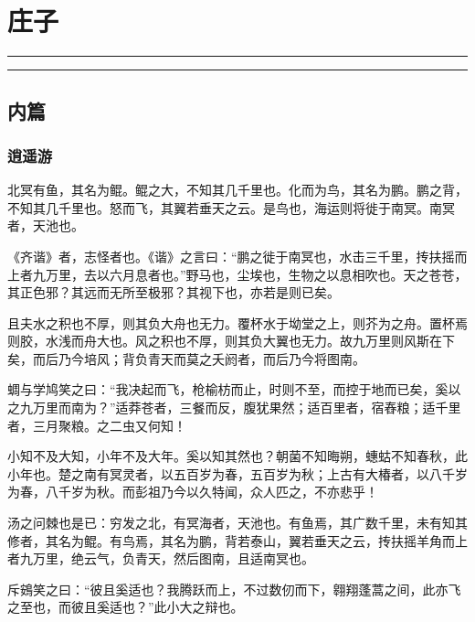 \documentclass[]{article}
\date{}
\begin{document}
\hypertarget{header-n0}{%
\section{庄子}\label{header-n0}}

\begin{center}\rule{0.5\linewidth}{\linethickness}\end{center}

\tableofcontents

\begin{center}\rule{0.5\linewidth}{\linethickness}\end{center}

\hypertarget{header-n8}{%
\subsection{内篇}\label{header-n8}}

\hypertarget{header-n9}{%
\subsubsection{逍遥游}\label{header-n9}}

北冥有鱼，其名为鲲。鲲之大，不知其几千里也。化而为鸟，其名为鹏。鹏之背，不知其几千里也。怒而飞，其翼若垂天之云。是鸟也，海运则将徙于南冥。南冥者，天池也。

《齐谐》者，志怪者也。《谐》之言曰：``鹏之徙于南冥也，水击三千里，抟扶摇而上者九万里，去以六月息者也。''野马也，尘埃也，生物之以息相吹也。天之苍苍，其正色邪？其远而无所至极邪？其视下也，亦若是则已矣。

且夫水之积也不厚，则其负大舟也无力。覆杯水于坳堂之上，则芥为之舟。置杯焉则胶，水浅而舟大也。风之积也不厚，则其负大翼也无力。故九万里则风斯在下矣，而后乃今培风；背负青天而莫之夭阏者，而后乃今将图南。

蜩与学鸠笑之曰：``我决起而飞，枪榆枋而止，时则不至，而控于地而已矣，奚以之九万里而南为？''适莽苍者，三餐而反，腹犹果然；适百里者，宿舂粮；适千里者，三月聚粮。之二虫又何知！

小知不及大知，小年不及大年。奚以知其然也？朝菌不知晦朔，蟪蛄不知春秋，此小年也。楚之南有冥灵者，以五百岁为春，五百岁为秋；上古有大椿者，以八千岁为春，八千岁为秋。而彭祖乃今以久特闻，众人匹之，不亦悲乎！

汤之问棘也是已：穷发之北，有冥海者，天池也。有鱼焉，其广数千里，未有知其修者，其名为鲲。有鸟焉，其名为鹏，背若泰山，翼若垂天之云，抟扶摇羊角而上者九万里，绝云气，负青天，然后图南，且适南冥也。

斥鴳笑之曰：``彼且奚适也？我腾跃而上，不过数仞而下，翱翔蓬蒿之间，此亦飞之至也，而彼且奚适也？''此小大之辩也。
\end{document}
